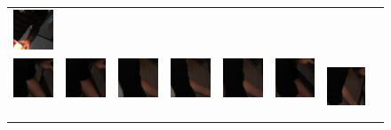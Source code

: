 \documentclass[runningheads]{llncs}
\begin{document}
\begin{figure}[t]
\begin{center}
\begin{tabular}{@{}c@{}c@{}c@{}c@{}c@{}c@{}c@{}c@{}}
\includegraphics[height=0.1375\linewidth]{figures/biposelets/poselet-230/sample-7-f0.jpg}\\
%
\includegraphics[height=0.1375\linewidth]{figures/biposelets/poselet-289/sample-1-f0.jpg}\,&
\includegraphics[height=0.1375\linewidth]{figures/biposelets/poselet-289/sample-2-f0.jpg}\,&
\includegraphics[height=0.1375\linewidth]{figures/biposelets/poselet-289/sample-3-f0.jpg}\,&
\includegraphics[height=0.1375\linewidth]{figures/biposelets/poselet-289/sample-4-f0.jpg}\,&
\includegraphics[height=0.1375\linewidth]{figures/biposelets/poselet-289/sample-5-f0.jpg}\,&
\includegraphics[height=0.1375\linewidth]{figures/biposelets/poselet-289/sample-6-f0.jpg}\,&
\includegraphics[height=0.1375\linewidth]{figures/biposelets/poselet-289/sample-7-f0.jpg}\\

\end{tabular}
\end{center}
\end{figure}
\end{document}
